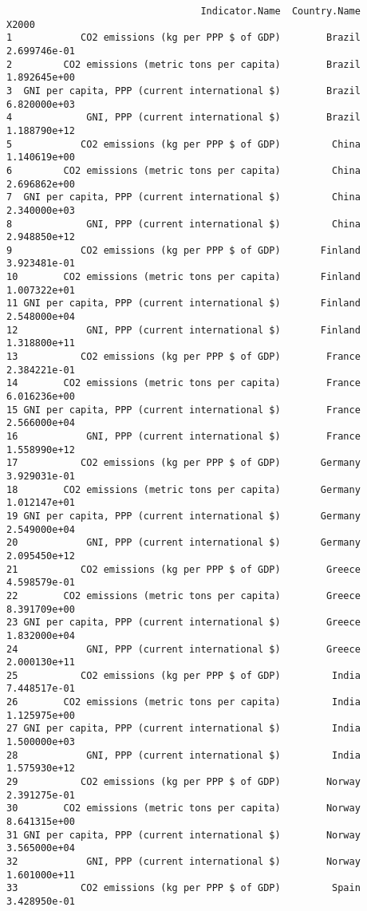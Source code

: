 \documentclass[xcolor={usenames,svgnames,dvipsnames}]{beamer}
\begin{document}
\begin{frame}[fragile]
\begin{verbatim}
                                  Indicator.Name  Country.Name        X2000
1            CO2 emissions (kg per PPP $ of GDP)        Brazil 2.699746e-01
2         CO2 emissions (metric tons per capita)        Brazil 1.892645e+00
3  GNI per capita, PPP (current international $)        Brazil 6.820000e+03
4             GNI, PPP (current international $)        Brazil 1.188790e+12
5            CO2 emissions (kg per PPP $ of GDP)         China 1.140619e+00
6         CO2 emissions (metric tons per capita)         China 2.696862e+00
7  GNI per capita, PPP (current international $)         China 2.340000e+03
8             GNI, PPP (current international $)         China 2.948850e+12
9            CO2 emissions (kg per PPP $ of GDP)       Finland 3.923481e-01
10        CO2 emissions (metric tons per capita)       Finland 1.007322e+01
11 GNI per capita, PPP (current international $)       Finland 2.548000e+04
12            GNI, PPP (current international $)       Finland 1.318800e+11
13           CO2 emissions (kg per PPP $ of GDP)        France 2.384221e-01
14        CO2 emissions (metric tons per capita)        France 6.016236e+00
15 GNI per capita, PPP (current international $)        France 2.566000e+04
16            GNI, PPP (current international $)        France 1.558990e+12
17           CO2 emissions (kg per PPP $ of GDP)       Germany 3.929031e-01
18        CO2 emissions (metric tons per capita)       Germany 1.012147e+01
19 GNI per capita, PPP (current international $)       Germany 2.549000e+04
20            GNI, PPP (current international $)       Germany 2.095450e+12
21           CO2 emissions (kg per PPP $ of GDP)        Greece 4.598579e-01
22        CO2 emissions (metric tons per capita)        Greece 8.391709e+00
23 GNI per capita, PPP (current international $)        Greece 1.832000e+04
24            GNI, PPP (current international $)        Greece 2.000130e+11
25           CO2 emissions (kg per PPP $ of GDP)         India 7.448517e-01
26        CO2 emissions (metric tons per capita)         India 1.125975e+00
27 GNI per capita, PPP (current international $)         India 1.500000e+03
28            GNI, PPP (current international $)         India 1.575930e+12
29           CO2 emissions (kg per PPP $ of GDP)        Norway 2.391275e-01
30        CO2 emissions (metric tons per capita)        Norway 8.641315e+00
31 GNI per capita, PPP (current international $)        Norway 3.565000e+04
32            GNI, PPP (current international $)        Norway 1.601000e+11
33           CO2 emissions (kg per PPP $ of GDP)         Spain 3.428950e-01

\end{verbatim}
\end{frame}
\end{document}
